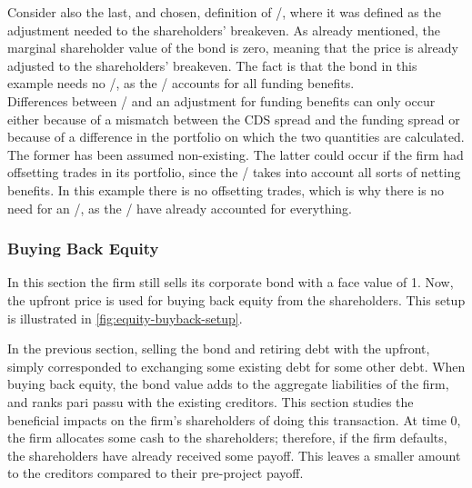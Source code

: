 \documentclass[main.tex]{subfiles}
\begin{document}
            Consider also the last, and chosen, definition of \FVA/,
            where it was defined as the adjustment needed to the shareholders' breakeven.
            As already mentioned, the marginal shareholder value of the bond is zero,
            meaning that the price is already adjusted to the shareholders' breakeven.
            The fact is that the bond in this example needs no \FVA/,
            as the \DVA/ accounts for all funding benefits.
            \\
            Differences between \DVA/ and an adjustment for funding benefits can only occur 
            either because of a mismatch between the CDS spread and the funding spread
            or because of a difference in the portfolio on which the two quantities are calculated. 
            The former has been assumed non-existing.
            The latter could occur if the firm had offsetting trades in its portfolio,
            since the \FVA/ takes into account all sorts of netting benefits.
            In this example there is no offsetting trades, 
            which is why there is no need for an \FVA/, as the \DVA/ have already accounted for everything.

        \subsubsection{Buying Back Equity}
            In this section the firm still sells its corporate bond with a face value of \num{1}.
            Now, the upfront price is used for buying back equity from the shareholders.
            This setup is illustrated in \cref{fig:equity-buyback-setup}.

            In the previous section, selling the bond and retiring debt with the upfront,
            simply corresponded to exchanging some existing debt for some other debt. 
            When buying back equity, the bond value adds to the aggregate liabilities of the firm, 
            and ranks pari passu with the existing creditors.
            This section studies the beneficial impacts on the firm's shareholders of doing this transaction.
            At time 0, the firm allocates some cash to the shareholders;
            therefore, if the firm defaults, the shareholders have already received some payoff.
            This leaves a smaller amount to the creditors compared to their pre-project payoff.
\end{document}

